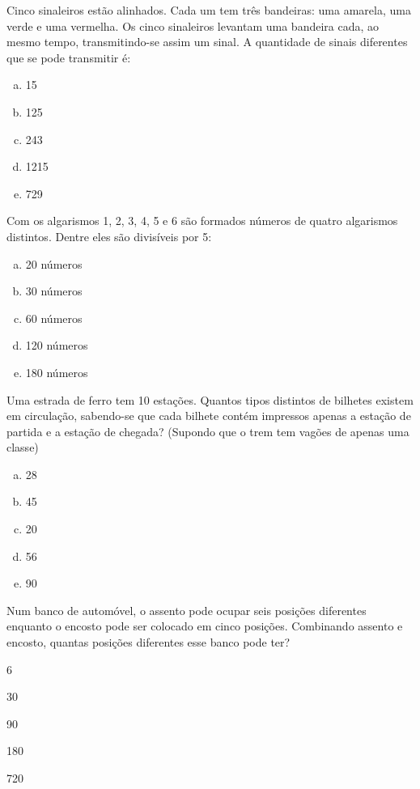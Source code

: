 		\item Cinco sinaleiros estão alinhados. Cada um tem três bandeiras: uma amarela, uma verde e uma vermelha. Os cinco sinaleiros levantam uma bandeira cada, ao mesmo tempo, transmitindo-se assim um sinal. A quantidade  de sinais diferentes que se pode transmitir é:
		\begin{multicols}{5}
		 \begin{enumerate}[a)]
		 	\item 15
		 	\item 125
		 	\item 243
		 	\item 1215
		 	\item 729 
		 \end{enumerate}
		 \end{multicols}

		\item Com os algarismos 1, 2, 3, 4, 5 e 6 são formados números de quatro algarismos distintos. Dentre eles são divisíveis por 5:
		\begin{multicols}{5}
		 \begin{enumerate}[a)]
		 	\item 20 números
		 	\item 30 números
		 	\item 60 números
		 	\item 120 números
		 	\item 180 números 
		 \end{enumerate}
		 \end{multicols}

		\item Uma estrada de ferro tem 10 estações. Quantos tipos distintos de bilhetes existem em circulação, sabendo-se que cada bilhete contém impressos apenas a estação de partida e a estação de chegada? (Supondo que o trem tem vagões de apenas uma classe)
		\begin{multicols}{5}
		 \begin{enumerate}[a)]
		 	\item 28
		 	\item 45 
		 	\item 20
		 	\item 56
		 	\item 90
		 \end{enumerate}
		 \end{multicols}

		
			\item Num banco de automóvel, o assento pode ocupar seis posições diferentes enquanto o encosto pode ser colocado em cinco posições. Combinando assento e encosto, quantas posições diferentes esse banco pode ter?
				\begin{enumerate}
				\end{enumerate}			

